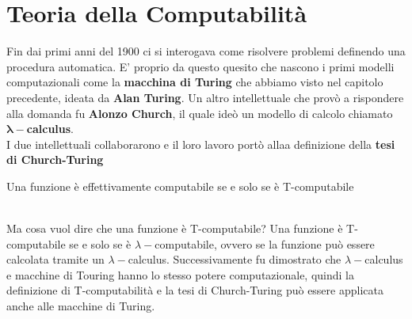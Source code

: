 \section{Teoria della Computabilità}
Fin dai primi anni del 1900 ci si interogava come risolvere problemi definendo una procedura automatica.
E' proprio da questo quesito che nascono i primi modelli computazionali come la \textbf{macchina di Turing} che abbiamo visto nel capitolo precedente,
ideata da \textbf{Alan Turing}. Un altro intellettuale che provò a rispondere alla domanda fu \textbf{Alonzo Church}, il quale ideò un modello di calcolo chiamato
$\bm{\lambda -}$\textbf{calculus}.\\
I due intellettuali collaborarono e il loro lavoro portò allaa definizione della \textbf{tesi di Church-Turing}\smallskip\\
\colorbox{SALZO}{\parbox{\dimexpr\linewidth-2\fboxsep}{\begin{theorem}
   Una funzione è effettivamente computabile se e solo se è T-computabile 
\end{theorem}}}\smallskip\\
Ma cosa vuol dire che una funzione è T-computabile? Una funzione è T-computabile se e solo se è $\lambda-$computabile,
ovvero se la funzione può essere calcolata tramite un $\lambda-$calculus.
Successivamente fu dimostrato che $\lambda-$calculus e macchine di Touring hanno lo stesso potere computazionale, quindi la definizione di T-computabilità e la tesi di Church-Turing
può essere applicata anche alle macchine di Turing.






